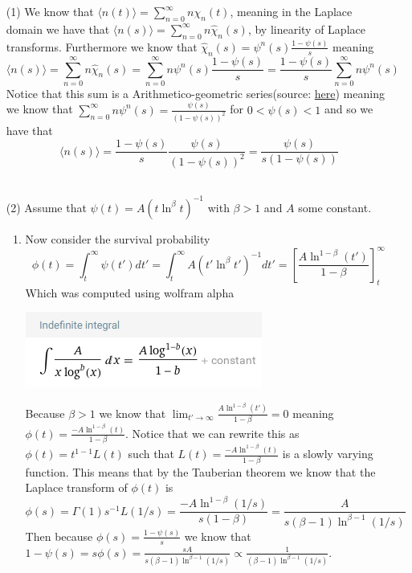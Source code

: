 \documentclass[12pt]{amsart}
\theoremstyle{definition}
\newcommand{\ra}{\rightarrow}
\newcommand{\ip}[1]{\langle#1\rangle}
\begin{document}
\begin{itemize}
\item[(1)] We know that $\ip{n(t)}=\sum_{n=0}^\infty n\chi_n(t)$, meaning in the Laplace domain we have that $\ip{n(s)}=\sum_{n=0}^\infty n\hat{\chi}_n(s)$, by linearity of Laplace transforms. Furthermore we know that $\hat{\chi}_n(s)=\psi^n(s)\frac{1-\psi(s)}{s}$ meaning
$$\ip{n(s)}=\sum_{n=0}^\infty n\hat{\chi}_n(s)=\sum_{n=0}^\infty n\psi^n(s)\frac{1-\psi(s)}{s}=\frac{1-\psi(s)}{s}\sum_{n=0}^\infty n\psi^n(s)$$
Notice that this sum is a Arithmetico-geometric series(source: \href{https://en.wikipedia.org/wiki/Arithmetico-geometric_sequence}{here}) meaning we know that $\sum_{n=0}^\infty n\psi^n(s)=\frac{\psi(s)}{\left(1-\psi(s)\right)^2}$ for $0<\psi(s)<1$ and so we have that
$$\ip{n(s)}=\frac{1-\psi(s)}{s}\frac{\psi(s)}{\left(1-\psi(s)\right)^2}=\frac{\psi(s)}{s(1-\psi(s))}$$\\

\item[(2)]
Assume that $\psi(t)=A(t\ln^\beta t)^{-1}$ with $\beta>1$ and $A$ some constant.
\begin{enumerate}[label=(\alph*)]
    \item Now consider the survival probability $$\phi(t)=\int_{t}^{\infty}\psi(t')dt'=\int_{t}^{\infty}A(t'\ln^\beta t')^{-1}dt'=\left[\frac{A\ln^{1-\beta}\left(t'\right)}{1-\beta}\right]^{\infty}_{t}$$
    Which was computed using wolfram alpha

    \includegraphics[scale=.8]{rw3p2int.png}

    Because $\beta>1$ we know that $\displaystyle{\lim_{t'\ra \infty} \frac{A\ln^{1-\beta}\left(t'\right)}{1-\beta}}=0$ meaning $\phi(t)=\displaystyle{\frac{-A\ln^{1-\beta}\left(t\right)}{1-\beta}}$. Notice that we can rewrite this as $\phi(t)=t^{1-1}L(t)$ such that $L(t)=\displaystyle{\frac{-A\ln^{1-\beta}\left(t\right)}{1-\beta}}$ is a slowly varying function. This means that by the Tauberian theorem we know that the Laplace transform of $\phi(t)$ is 
    $$\phi(s)=\Gamma(1)s^{-1}L(1/s)=\frac{-A\ln^{1-\beta}(1/s)}{s(1-\beta)}=\frac{A}{s(\beta-1)\ln^{\beta-1}(1/s)}$$
    Then because $\phi(s)=\frac{1-\psi(s)}{s}$ we know that $1-\psi(s)=s\phi(s)=\frac{sA}{s(\beta-1)\ln^{\beta-1}(1/s)}\propto\frac{1}{(\beta-1)\ln^{\beta-1}(1/s)}$.\\
    

\end{enumerate}
\end{itemize}
\end{document}

